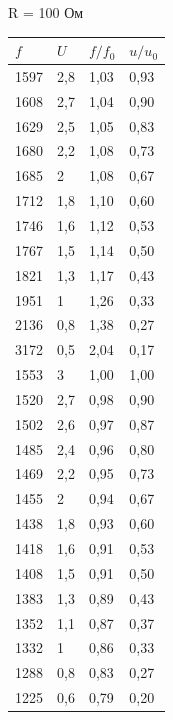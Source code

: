 \documentclass[a4paper,12pt]{article}
\begin{document}
\begin{figure}[h!]
\begin{minipage}[h]{0.49\linewidth}
				\centering
				R = 100 Ом
				
						\begin{tabular}{|l|l|l|l|}
							\hline\hline
							$f$    & $U$     & $f/f_0$ & $u/u_0$ \\ \hline
							1597 & 2,8 & 1,03   & 0,93   \\ \hline
							1608 & 2,7 & 1,04   & 0,90   \\ \hline
							1629 & 2,5 & 1,05   & 0,83   \\ \hline
							1680 & 2,2 & 1,08   & 0,73   \\ \hline
							1685 & 2   & 1,08   & 0,67   \\ \hline
							1712 & 1,8 & 1,10   & 0,60   \\ \hline
							1746 & 1,6 & 1,12   & 0,53   \\ \hline
							1767 & 1,5 & 1,14   & 0,50   \\ \hline
							1821 & 1,3 & 1,17   & 0,43   \\ \hline
							1951 & 1   & 1,26   & 0,33   \\ \hline
							2136 & 0,8 & 1,38   & 0,27   \\ \hline
							3172 & 0,5 & 2,04   & 0,17   \\ \hline
							1553 & 3   & 1,00   & 1,00   \\ \hline
							1520 & 2,7 & 0,98   & 0,90   \\ \hline
							1502 & 2,6 & 0,97   & 0,87   \\ \hline
							1485 & 2,4 & 0,96   & 0,80   \\ \hline
							1469 & 2,2 & 0,95   & 0,73   \\ \hline
							1455 & 2   & 0,94   & 0,67   \\ \hline
							1438 & 1,8 & 0,93   & 0,60   \\ \hline
							1418 & 1,6 & 0,91   & 0,53   \\ \hline
							1408 & 1,5 & 0,91   & 0,50   \\ \hline
							1383 & 1,3 & 0,89   & 0,43   \\ \hline
							1352 & 1,1 & 0,87   & 0,37   \\ \hline
							1332 & 1   & 0,86   & 0,33   \\ \hline
							1288 & 0,8 & 0,83   & 0,27   \\ \hline
							1225 & 0,6 & 0,79   & 0,20   \\ \hline\hline
						\end{tabular}	
			\end{minipage}
			\hfill
		\end{figure}
		
\end{document}
